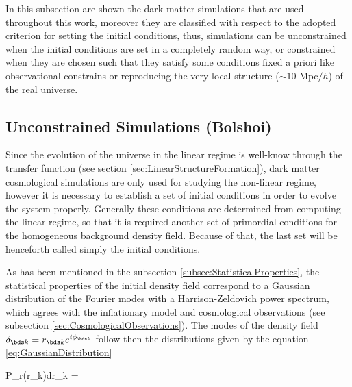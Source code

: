 In this subsection are shown the dark matter simulations that are used
throughout this work, moreover they are classified with respect to the
adopted criterion for setting the initial conditions, thus, simulations
can be unconstrained when the initial conditions are set in a completely 
random way, or constrained when they are chosen such that they satisfy 
some conditions fixed a priori like observational constrains or 
reproducing the very local structure ($\sim 10$ Mpc$/h$) of the real 
universe.


	\subsection{Unconstrained Simulations (Bolshoi)}
	\label{subsec:UnconstrainedSimulations}


Since the evolution of the universe in the linear regime is well-know 
through the transfer function (see section 
\ref{sec:LinearStructureFormation}), dark matter cosmological simulations 
are only used for studying the non-linear regime, however it is necessary 
to establish a set of initial conditions in order to evolve the system 
properly. Generally these conditions are determined from computing the 
linear regime, so that it is required another set of primordial conditions 
for the homogeneous background density field. Because of that, the last 
set will be henceforth called simply the initial conditions.


As has been mentioned in the subsection \ref{subsec:StatisticalProperties},
the statistical properties of the initial density field correspond to a
Gaussian distribution of the Fourier modes with a Harrison-Zeldovich 
power spectrum, which agrees with the inflationary model and cosmological
observations (see subsection \ref{sec:CosmologicalObservations}). The 
modes of the density field $\delta_{\bds k} = r_{\bds k}e^{i\phi_{\bds k}}$
follow then the distributions given by the equation 
\ref{eq:GaussianDistribution}



{ P_r(r_{\bds k})dr_{\bds k} = \exp{}
 }


